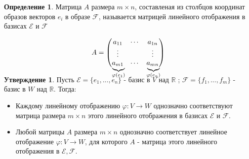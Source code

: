 \documentclass[a4paper, 12pt]{article}
\newcommand{\R}{\mathbb R}
\renewcommand{\phi}{\varphi}
\newcommand\undermat[2]{\makebox[0pt][l]{$\smash{\underbrace
{\phantom{\begin{matrix}#2\end{matrix}}}_{\text{$#1$}}}$}#2}
\theoremstyle{definition}
\newtheorem*{definition}{Определение}
\newtheorem*{subtheorem}{Утверждение}
\begin{document}
  \begin{definition}
    Матрица $A$ размера $m \times n$,  составленая из столбцов координат образов векторов $e_i$ в образе $\mathcal{F}$, называется матрицей линейного отображения в базисах $\mathcal{E} $ и $\mathcal{F}$  
  \end{definition} 
  $$A = \begin{pmatrix}
    a_{11} & \cdots & a_{1n} \\
    \vdots & \null & \vdots \\
    \undermat{\phi(e_1)}{a_{m1}}  & \cdots & \undermat{\phi(e_n)}{a_{mn}} 
  \end{pmatrix}$$  
  \vspace{0.3cm}
  \begin{subtheorem}
    Пусть $\mathcal{E}  = \{e_1,...,e_n\}$ - базис в $V$ над $\R$ ; $\mathcal{F}  = \{f_1,...,f_m\}$ - базис в $W$ над $\R$. Тогда:
    \begin{itemize}
      \item Каждому линейному отображению $\phi: V \to W$ однозначно соответствуют матрица размера $m \times n$ этого линейного отображения в базисах $\mathcal{E} \text{ и } \mathcal{F}$.
      \item Любой матрицы $A$ размера $m \times n$ однозначно соответствует линейное отображение $\phi: V \to W$, для которого $A$ - матрица этого линейного отображения в $\mathcal{E}, \mathcal{F}$.
    \end{itemize}
  \end{subtheorem} 
\end{document}
